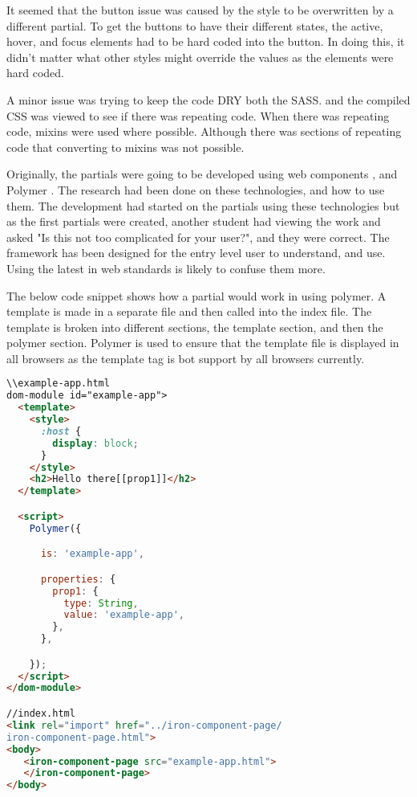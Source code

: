 It seemed that the button issue was caused by the style to be overwritten by a different partial. To get the buttons to have their different states, the active, hover, and focus elements had to be hard coded into the button. In doing this, it didn't matter what other styles might override the values as the elements were hard coded.

A minor issue was trying to keep the code DRY both the SASS. and the compiled CSS was viewed to see if there was repeating code. When there was repeating code, \gls{mixins} were used where possible. Although there was sections of repeating code that converting to \gls{mixins} was not possible. 

Originally, the partials were going to be developed using web components \citet{Web17}, and Polymer \citet{Google17b}. The research had been done on these technologies, and how to use them. The development had started on the partials using these technologies but as the first partials were created, another student had viewing the work and asked "Is this not too complicated for your user?", and they were correct. The framework has been designed for the entry level user to understand, and use. Using the latest in web standards is likely to confuse them more. 

The below code snippet shows how a partial would work in using polymer. A template is made in a separate file and then called into the index file. The template is broken into different sections, the template section, and then the polymer section. Polymer is used to ensure that the template file is displayed in all browsers as the template tag is bot support by all browsers currently. 

\begin{lstlisting}[language=HTML]
\\example-app.html
dom-module id="example-app">
  <template>
    <style>
      :host {
        display: block;
      }
    </style>
    <h2>Hello there[[prop1]]</h2>
  </template>

  <script>
    Polymer({

      is: 'example-app',

      properties: {
        prop1: {
          type: String,
          value: 'example-app',
        },
      },

    });
  </script>
</dom-module>

//index.html
<link rel="import" href="../iron-component-page/
iron-component-page.html">
<body>
   <iron-component-page src="example-app.html">
   </iron-component-page>
</body>
\end{lstlisting}

